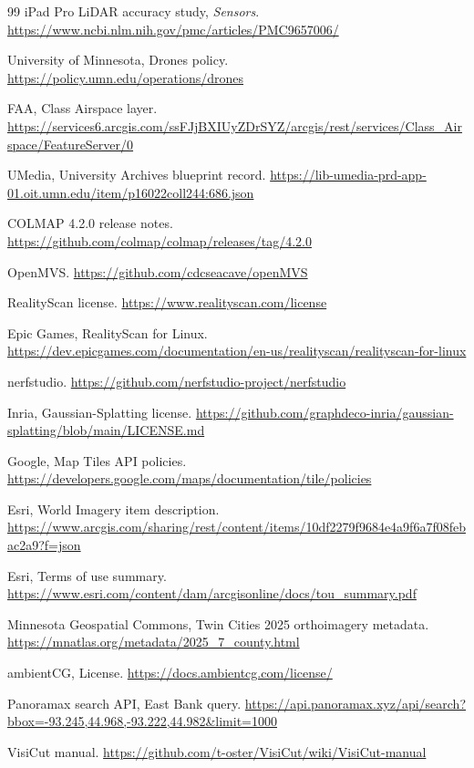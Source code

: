 \documentclass[11pt,letterpaper]{article}
\begin{document}
\begin{thebibliography}{99}
 iPad Pro LiDAR accuracy study, \emph{Sensors}. \url{https://www.ncbi.nlm.nih.gov/pmc/articles/PMC9657006/}

 University of Minnesota, Drones policy. \url{https://policy.umn.edu/operations/drones}

 FAA, Class Airspace layer. \url{https://services6.arcgis.com/ssFJjBXIUyZDrSYZ/arcgis/rest/services/Class_Airspace/FeatureServer/0}

 UMedia, University Archives blueprint record. \url{https://lib-umedia-prd-app-01.oit.umn.edu/item/p16022coll244:686.json}

 COLMAP 4.2.0 release notes. \url{https://github.com/colmap/colmap/releases/tag/4.2.0}

 OpenMVS. \url{https://github.com/cdcseacave/openMVS}

 RealityScan license. \url{https://www.realityscan.com/license}

 Epic Games, RealityScan for Linux. \url{https://dev.epicgames.com/documentation/en-us/realityscan/realityscan-for-linux}

 nerfstudio. \url{https://github.com/nerfstudio-project/nerfstudio}

 Inria, Gaussian-Splatting license. \url{https://github.com/graphdeco-inria/gaussian-splatting/blob/main/LICENSE.md}

 Google, Map Tiles API policies. \url{https://developers.google.com/maps/documentation/tile/policies}

 Esri, World Imagery item description. \url{https://www.arcgis.com/sharing/rest/content/items/10df2279f9684e4a9f6a7f08febac2a9?f=json}

 Esri, Terms of use summary. \url{https://www.esri.com/content/dam/arcgisonline/docs/tou_summary.pdf}

 Minnesota Geospatial Commons, Twin Cities 2025 orthoimagery metadata. \url{https://mnatlas.org/metadata/2025_7_county.html}

 ambientCG, License. \url{https://docs.ambientcg.com/license/}

 Panoramax search API, East Bank query. \url{https://api.panoramax.xyz/api/search?bbox=-93.245,44.968,-93.222,44.982&limit=1000}

 VisiCut manual. \url{https://github.com/t-oster/VisiCut/wiki/VisiCut-manual}


\end{thebibliography}
\end{document}

